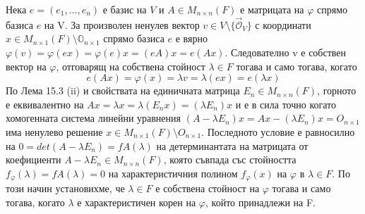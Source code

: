 \documentclass{article}
\newcommand*{\nullvec}{\vec{\mathcal{O}}}
\begin{document}
Нека $e = (e_1, ... , e_n)$ е базис на $V$ и $A \in M_{n\times n}(F)$ е матрицата на $\varphi$ спрямо
базиса $e$ на V. За произволен ненулев вектор $v \in V \setminus \{\nullvec_V \}$ с координати
$x \in M_{n\times 1}(F) \setminus {\mathbb{O}_{n\times 1}}$ спрямо базиса $e$ е вярно
$\varphi(v) = \varphi(ex) = \varphi(e)x = (eA)x = e(Ax)$. Следователно v е собствен вектор на $\varphi$,
отговарящ на собствена стойност $\lambda \in F$ тогава и само тогава, когато
\[
    e(Ax)=\varphi(x)=\lambda v=\lambda(ex)=e(\lambda x)
\]
По Лема 15.3 (ii) и свойствата на единичната матрица $E_n \in M_{n\times n}(F)$, горното е
еквивалентно на $Ax = \lambda x = \lambda(E_nx) = (\lambda E_n)x$ и е в сила точно когато хомогенната
система линейни уравнения $(A-\lambda E_n)x = Ax-(\lambda E_n)x = O_{n\times 1}$
има ненулево решение $x \in M_{n\times 1}(F)\setminus{O_{n\times 1}}$. Последното условие е
равносилно на $0 = det(A - \lambda E_n) = fA(\lambda)$ на детерминантата на матрицата от
коефициенти $A-\lambda E_n \in M_{n\times n}(F)$, която съвпада със стойността
$f_\varphi(\lambda) = fA(\lambda) = 0$ на характеристичния полином $f_\varphi(x)$ на $\varphi$ в $\lambda\in F$.
По този начин установихме, че $\lambda \in F$ е собствена стойност на $\varphi$ тогава и само тогава,
когато $\lambda$ е характеристичен корен на $\varphi$, който принадлежи на F.
\end{document}

